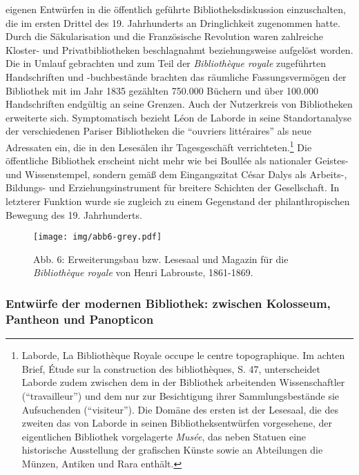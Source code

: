 eigenen Entwürfen in die öffentlich geführte Bibliotheksdiskussion
einzuschalten, die im ersten Drittel des 19. Jahrhunderts an
Dringlichkeit zugenommen hatte. Durch die Säkularisation und die
Französische Revolution waren zahlreiche Kloster- und Privatbibliotheken
beschlagnahmt beziehungsweise aufgelöst worden. Die in Umlauf gebrachten
und zum Teil der \emph{Bibliothèque royale} zugeführten Handschriften
und -buchbestände brachten das räumliche Fassungsvermögen der Bibliothek
mit im Jahr 1835 gezählten 750.000 Büchern und über 100.000
Handschriften endgültig an seine Grenzen. Auch der Nutzerkreis von
Bibliotheken erweiterte sich. Symptomatisch bezieht Léon de Laborde in
seine Standortanalyse der verschiedenen Pariser Bibliotheken die
\enquote{ouvriers littéraires} als neue Adressaten ein, die in den
Lesesälen ihr Tagesgeschäft verrichteten.\footnote{Laborde, La
  Bibliothèque Royale occupe le centre topographique. Im achten Brief,
  Étude sur la construction des bibliothèques, S. 47, unterscheidet
  Laborde zudem zwischen dem in der Bibliothek arbeitenden
  Wissenschaftler (\enquote{travailleur}) und dem nur zur Besichtigung
  ihrer Sammlungsbestände sie Aufsuchenden (\enquote{visiteur}). Die
  Domäne des ersten ist der Lesesaal, die des zweiten das von Laborde in
  seinen Bibliotheksentwürfen vorgesehene, der eigentlichen Bibliothek
  vorgelagerte \emph{Musée}, das neben Statuen eine historische
  Ausstellung der grafischen Künste sowie an Abteilungen die Münzen,
  Antiken und Rara enthält.} Die öffentliche Bibliothek erscheint nicht
mehr wie bei Boullée als nationaler Geistes- und Wissenstempel, sondern
gemäß dem Eingangszitat César Dalys als Arbeits-, Bildungs- und
Erziehungsinstrument für breitere Schichten der Gesellschaft. In
letzterer Funktion wurde sie zugleich zu einem Gegenstand der
philanthropischen Bewegung des 19. Jahrhunderts.

\begin{figure}[htbp]
\centering
\texttt{[image: img/abb6-grey.pdf]}
\caption*{Abb. 6: Erweiterungsbau bzw. Lesesaal und Magazin für die
\emph{Bibliothèque royale} von Henri Labrouste, 1861-1869.}
\end{figure}

\subsubsection{Entwürfe der modernen Bibliothek: zwischen Kolosseum,
Pantheon und
Panopticon}\label{entwuxfcrfe-der-modernen-bibliothek-zwischen-kolosseum-pantheon-und-panopticon}

